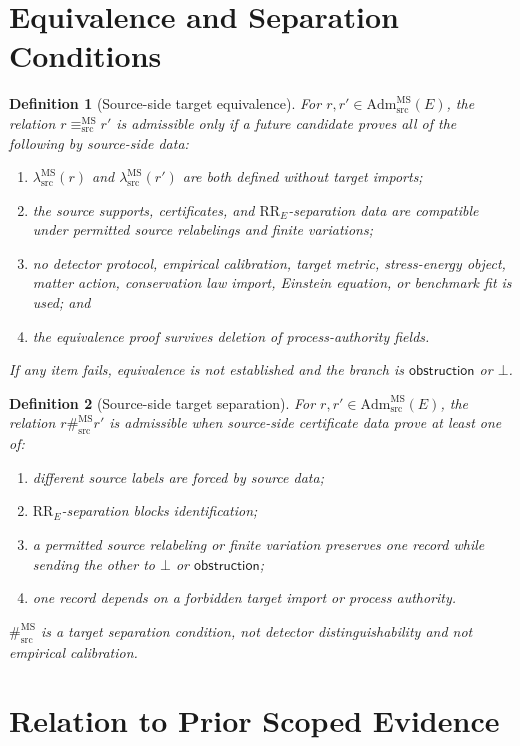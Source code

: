 \documentclass[11pt]{article}
\newcommand{\AdmSrc}{\mathrm{Adm}^{\mathrm{MS}}_{\mathrm{src}}}
\newcommand{\lambdaSrc}{\lambda^{\mathrm{MS}}_{\mathrm{src}}}
\newcommand{\EqMS}{\equiv^{\mathrm{MS}}_{\mathrm{src}}}
\newcommand{\SepMS}{\#^{\mathrm{MS}}_{\mathrm{src}}}
\newcommand{\Bottom}{\bot}
\newcommand{\Obstruction}{\mathsf{obstruction}}
\newcommand{\RRE}{\mathrm{RR}_E}
\newtheorem{definition}{Definition}
\begin{document}
\section{Equivalence and Separation Conditions}

\begin{definition}[Source-side target equivalence]
For \(r,r'\in\AdmSrc(E)\), the relation \(r\EqMS r'\) is admissible only if a
future candidate proves all of the following by source-side data:
\begin{enumerate}[label=E\arabic*.,leftmargin=*]
  \item \(\lambdaSrc(r)\) and \(\lambdaSrc(r')\) are both defined without
  target imports;
  \item the source supports, certificates, and \(\RRE\)-separation data are
  compatible under permitted source relabelings and finite variations;
  \item no detector protocol, empirical calibration, target metric,
  stress-energy object, matter action, conservation law import, Einstein
  equation, or benchmark fit is used; and
  \item the equivalence proof survives deletion of process-authority fields.
\end{enumerate}
If any item fails, equivalence is not established and the branch is
\(\Obstruction\) or \(\Bottom\).
\end{definition}

\begin{definition}[Source-side target separation]
For \(r,r'\in\AdmSrc(E)\), the relation \(r\SepMS r'\) is admissible when
source-side certificate data prove at least one of:
\begin{enumerate}[label=S\arabic*.,leftmargin=*]
  \item different source labels are forced by source data;
  \item \(\RRE\)-separation blocks identification;
  \item a permitted source relabeling or finite variation preserves one record
  while sending the other to \(\Bottom\) or \(\Obstruction\);
  \item one record depends on a forbidden target import or process authority.
\end{enumerate}
\(\SepMS\) is a target separation condition, not detector distinguishability
and not empirical calibration.
\end{definition}

\section{Relation to Prior Scoped Evidence}
\end{document}
